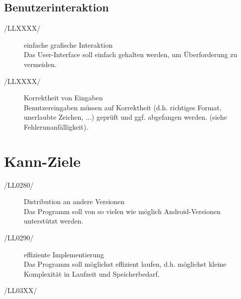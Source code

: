 \documentclass[11pt,a4paper]{scrreprt}
\begin{document}
\subsection{Benutzerinteraktion}
\begin{description}
\item[/LLXXXX/] einfache grafische Interaktion \ \\
Das User-Interface soll einfach gehalten werden, um Überforderung zu vermeiden. 
\item[/LLXXXX/] Korrektheit von Eingaben \ \\
Benutzereingaben müssen auf Korrektheit (d.h. richtiges Format, unerlaubte Zeichen, ...) geprüft und ggf. abgefangen werden.
(siehe Fehlerunanfälligkeit).
\end{description}

\section{Kann-Ziele}
\begin{description}
\item[/LL0280/] Distribution an andere Versionen \ \\
Das Programm soll von so vielen wie möglich Android-Versionen unterstützt werden.
\item[/LL0290/] effiziente Implementierung \ \\
Das Programm soll möglichst effizient laufen, d.h. möglichst kleine Komplexität in Laufzeit und Speicherbedarf.
\item[/LL03XX/]
\end{description}
\end{document}
